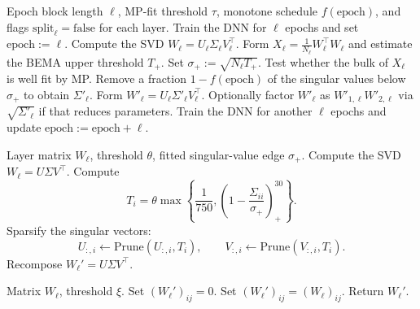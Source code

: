 \documentclass[11pt]{article}
\theoremstyle{plain}
\theoremstyle{definition}
\theoremstyle{remark}
\DeclarePairedDelimiter{\abs}{\lvert}{\rvert}
\newcommand{\1}{\mathbf{1}}
\begin{document}
\begin{algorithm}[H]
\caption{MP-based pruning algorithm for the fully connected examples}
\label{algo_1}
\begin{algorithmic}[1]
\Require Epoch block length \(\ell\), MP-fit threshold \(\tau\), monotone schedule \(f(\mathrm{epoch})\), and flags \(\mathrm{split}_\ell=\mathrm{false}\) for each layer.
\State Train the DNN for \(\ell\) epochs and set \(\mathrm{epoch}:=\ell\).
    \State Compute the SVD \(W_\ell=U_\ell\Sigma_\ell V_\ell^\top\).
    \State Form \(X_\ell=\frac1{N_\ell}W_\ell^\top W_\ell\) and estimate the BEMA upper threshold \(T_+\).
    \State Set \(\sigma_+:=\sqrt{N_\ell T_+}\).
    \State Test whether the bulk of \(X_\ell\) is well fit by MP.
        \State Remove a fraction \(1-f(\mathrm{epoch})\) of the singular values below \(\sigma_+\) to obtain \(\Sigma'_\ell\).
        \State Form \(W'_\ell=U_\ell\Sigma'_\ell V_\ell^\top\).
        \State Optionally factor \(W'_\ell\) as \(W'_{1,\ell}W'_{2,\ell}\) via \(\sqrt{\Sigma'_\ell}\) if that reduces parameters.
    \EndIf
\EndFor
\State Train the DNN for another \(\ell\) epochs and update \(\mathrm{epoch}:=\mathrm{epoch}+\ell\).
\EndWhile
\end{algorithmic}
\end{algorithm}

\begin{algorithm}[H]
\caption{Sparsify singular vectors}
\label{spar_sing_vectors}
\begin{algorithmic}[1]
\Require Layer matrix \(W_\ell\), threshold \(\theta\), fitted singular-value edge \(\sigma_+\).
\State Compute the SVD \(W_\ell=U\Sigma V^\top\).
    \State Compute
    \[
    T_i=\theta\max\left\{\frac1{750},\left(1-\frac{\Sigma_{ii}}{\sigma_+}\right)_+^{30}\right\}.
    \]
    \State Sparsify the singular vectors:
    \[
    U_{:,i}\leftarrow \mathrm{Prune}(U_{:,i},T_i),
    \qquad
    V_{:,i}\leftarrow \mathrm{Prune}(V_{:,i},T_i).
    \]
\EndFor
\State Recompose \(W_\ell'=U\Sigma V^\top\).
\end{algorithmic}
\end{algorithm}

\begin{algorithm}[H]
\caption{Element-wise sparsification}
\label{spars_algo}
\begin{algorithmic}[1]
\Require Matrix \(W_\ell\), threshold \(\xi\).
        \State Set \((W_\ell')_{ij}=0\).
    \Else
        \State Set \((W_\ell')_{ij}=(W_\ell)_{ij}\).
    \EndIf
\EndFor
\State Return \(W_\ell'\).
\end{algorithmic}
\end{algorithm}
\end{document}
